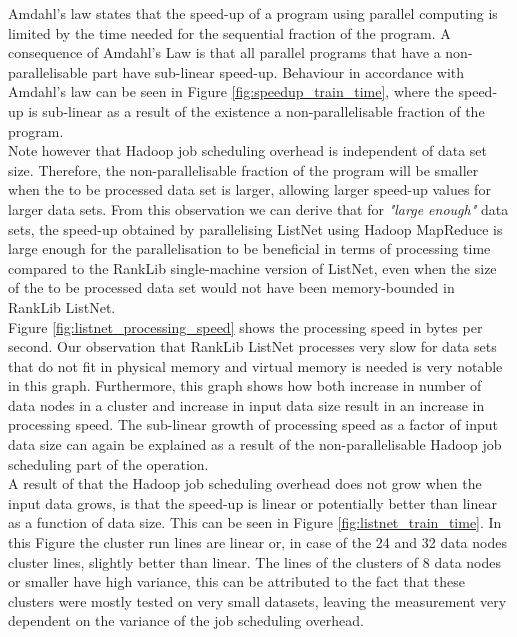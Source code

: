 Amdahl's law states that the speed-up of a program using parallel computing is limited by the time needed for the sequential fraction of the program. A consequence of Amdahl's Law is that all parallel programs that have a non-parallelisable part have sub-linear speed-up. Behaviour in accordance with Amdahl's law can be seen in Figure \ref{fig:speedup_train_time}, where the speed-up is sub-linear as a result of the existence a non-parallelisable fraction of the program.\\

Note however that Hadoop job scheduling overhead is independent of data set size. Therefore, the non-parallelisable fraction of the program will be smaller when the to be processed data set is larger, allowing larger speed-up values for larger data sets. From this observation we can derive that for \emph{"large enough"} data sets, the speed-up obtained by parallelising ListNet using Hadoop MapReduce is large enough for the parallelisation to be beneficial in terms of processing time compared to the RankLib single-machine version of ListNet, even when the size of the to be processed data set would not have been memory-bounded in RankLib ListNet.\\

Figure \ref{fig:listnet_processing_speed} shows the processing speed in bytes per second. Our observation that RankLib ListNet processes very slow for data sets that do not fit in physical memory and virtual memory is needed is very notable in this graph. Furthermore, this graph shows how both increase in number of data nodes in a cluster and increase in input data size result in an increase in processing speed. The sub-linear growth of processing speed as a factor of input data size can again be explained as a result of the non-parallelisable Hadoop job scheduling part of the operation.\\

A result of that the Hadoop job scheduling overhead does not grow when the input data grows, is that the speed-up is linear or potentially better than linear as a function of data size. This can be seen in Figure \ref{fig:listnet_train_time}. In this Figure the cluster run lines are linear or, in case of the 24 and 32 data nodes cluster lines, slightly better than linear. The lines of the clusters of 8 data nodes or smaller have high variance, this can be attributed to the fact that these clusters were mostly tested on very small datasets, leaving the measurement very dependent on the variance of the job scheduling overhead.

